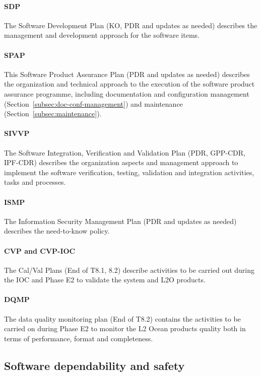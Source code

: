 \paragraph*{SDP} The Software Development Plan (KO, PDR and updates as needed) describes the management and development approach for the software items.
    
\paragraph*{SPAP} This Software Product Assurance Plan (PDR and updates as needed) describes the organization and technical approach to the execution of the software product assurance programme, including documentation and configuration management (Section~\ref{subsec:doc-conf-management}) and maintenance (Section~\ref{subsec:maintenance}).
    
\paragraph*{SIVVP} The Software Integration, Verification and Validation Plan (PDR, GPP-CDR, IPF-CDR) describes the organization aspects and management approach to implement the software verification, testing, validation and integration activities, tasks and processes.
    
\paragraph*{ISMP} The Information Security Management Plan (PDR and updates as needed) describes the need-to-know policy.
    
\paragraph*{CVP and CVP-IOC} The Cal/Val Plans (End of T8.1, 8.2) describe activities to be carried out during the IOC and Phase E2 to validate the system and L2O products.
    
\paragraph*{DQMP} The data quality monitoring plan (End of T8.2) contains the activities to be carried on during Phase E2 to monitor the L2 Ocean products quality both in terms of performance, format and completeness.




\subsection{Software dependability and safety}
\label{subsec:software-dependability-safety}

